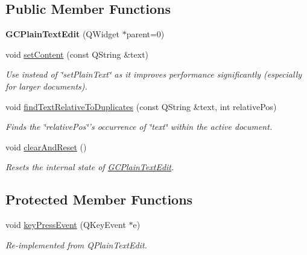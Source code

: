 \subsection*{\-Public \-Member \-Functions}
\begin{DoxyCompactItemize}
\item 
\hypertarget{class_g_c_plain_text_edit_a203ef559af2845620fc2370dee142c19}{{\bfseries \-G\-C\-Plain\-Text\-Edit} (\-Q\-Widget $\ast$parent=0)}\label{class_g_c_plain_text_edit_a203ef559af2845620fc2370dee142c19}

\item 
void \hyperlink{class_g_c_plain_text_edit_af658d66d1fe8c1885d708de16b115b0f}{set\-Content} (const \-Q\-String \&text)
\begin{DoxyCompactList}\small\item\em \-Use instead of \char`\"{}set\-Plain\-Text\char`\"{} as it improves performance significantly (especially for larger documents). \end{DoxyCompactList}\item 
void \hyperlink{class_g_c_plain_text_edit_a9c3603b9e62a7737b8d442da4a16109d}{find\-Text\-Relative\-To\-Duplicates} (const \-Q\-String \&text, int relative\-Pos)
\begin{DoxyCompactList}\small\item\em \-Finds the \char`\"{}relative\-Pos\char`\"{}'s occurrence of \char`\"{}text\char`\"{} within the active document. \end{DoxyCompactList}\item 
void \hyperlink{class_g_c_plain_text_edit_a974f08b952447cec6f1935140d9808b1}{clear\-And\-Reset} ()
\begin{DoxyCompactList}\small\item\em \-Resets the internal state of \hyperlink{class_g_c_plain_text_edit}{\-G\-C\-Plain\-Text\-Edit}. \end{DoxyCompactList}\end{DoxyCompactItemize}
\subsection*{\-Protected \-Member \-Functions}
\begin{DoxyCompactItemize}
\item 
void \hyperlink{class_g_c_plain_text_edit_aed3616e5adab461d83bc6ab1497128e2}{key\-Press\-Event} (\-Q\-Key\-Event $\ast$e)
\begin{DoxyCompactList}\small\item\em \-Re-\/implemented from \-Q\-Plain\-Text\-Edit. \end{DoxyCompactList}\end{DoxyCompactItemize}


